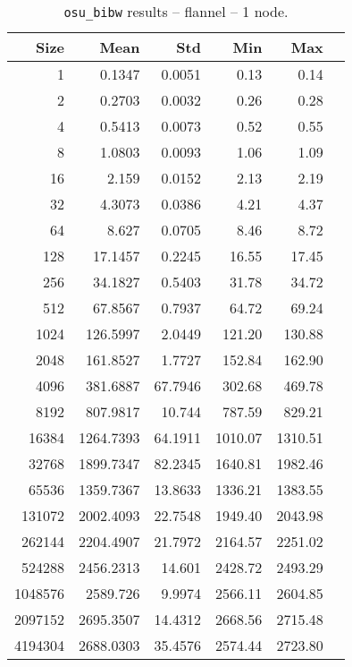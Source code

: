 
\begin{table}[htbp]
  \centering
  \begin{minipage}{.48\textwidth}
    \centering
    \footnotesize
  \begin{tabular}{rrrrrr}
	\toprule
	\textbf{Size} & \textbf{Mean} & \textbf{Std} & \textbf{Min} & \textbf{Max}	\\
	\midrule
	1	&	0.1347   	&	0.0051	&	0.13	&	0.14	\\
	2	&	0.2703   	&	0.0032	&	0.26	&	0.28	\\
	4	&	0.5413   	&	0.0073	&	0.52	&	0.55	\\
	8	&	1.0803   	&	0.0093	&	1.06	&	1.09	\\
	16	&	2.159   	&	0.0152	&	2.13	&	2.19	\\
	32	&	4.3073   	&	0.0386	&	4.21	&	4.37	\\
	64	&	8.627   	&	0.0705	&	8.46	&	8.72	\\
	128	&	17.1457   	&	0.2245	&	16.55	&	17.45	\\
	256	&	34.1827   	&	0.5403	&	31.78	&	34.72	\\
	512	&	67.8567   	&	0.7937	&	64.72	&	69.24	\\
	1024	&	126.5997   	&	2.0449	&	121.20	&	130.88	\\
	2048	&	161.8527   	&	1.7727	&	152.84	&	162.90	\\
	4096	&	381.6887   	&	67.7946	&	302.68	&	469.78	\\
	8192	&	807.9817   	&	10.744	&	787.59	&	829.21	\\
	16384	&	1264.7393   	&	64.1911	&	1010.07	&	1310.51	\\
	32768	&	1899.7347   	&	82.2345	&	1640.81	&	1982.46	\\
	65536	&	1359.7367   	&	13.8633	&	1336.21	&	1383.55	\\
	131072	&	2002.4093   	&	22.7548	&	1949.40	&	2043.98	\\
	262144	&	2204.4907   	&	21.7972	&	2164.57	&	2251.02	\\
	524288	&	2456.2313   	&	14.601	&	2428.72	&	2493.29	\\
	1048576	&	2589.726   	&	9.9974	&	2566.11	&	2604.85	\\
	2097152	&	2695.3507   	&	14.4312	&	2668.56	&	2715.48	\\
	4194304	&	2688.0303   	&	35.4576	&	2574.44	&	2723.80	\\
	\bottomrule
	\end{tabular}
  \caption{\texttt{osu\_bibw} results -- flannel -- 1 node.}

\end{minipage}
\end{table}

